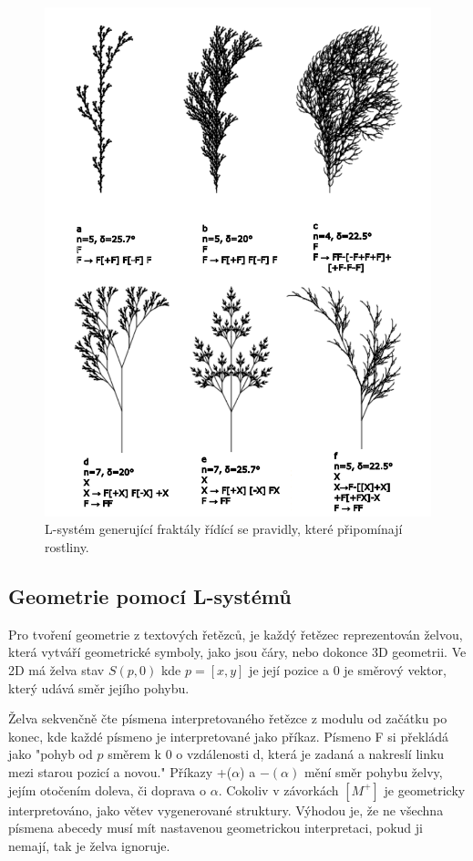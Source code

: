 \begin{figure}[H]
	\centering
	\includegraphics[scale=1]{obrazky-figures/LTrees.pdf}
	\caption{L-systém generující fraktály řídící se pravidly, které připomínají rostliny.}
	\label{lSystem}
\end{figure}

\subsection{Geometrie pomocí L-systémů}
\label{lsystemGeometry}
Pro tvoření geometrie z textových řetězců, je každý řetězec reprezentován želvou, která vytváří geometrické symboly, jako jsou čáry, nebo dokonce 3D geometrii.
Ve 2D má želva stav $S(p,0)$ kde $p=[x,y]$ je její pozice a $0$ je směrový vektor, který udává směr jejího pohybu. 

Želva sekvenčně čte písmena interpretovaného řetězce z modulu od začátku po konec, kde každé písmeno je interpretované jako příkaz. Písmeno F si překládá jako "pohyb od $p$ směrem k $0$ o vzdálenosti d, která je zadaná a nakreslí linku mezi starou pozicí a novou." Příkazy +($\alpha$) a $-(\alpha)$ mění směr pohybu želvy, jejím otočením doleva, či doprava o $\alpha$. Cokoliv v závorkách $[M^+]$ je geometricky interpretováno, jako větev vygenerované struktury. Výhodou je, že ne všechna písmena abecedy musí mít nastavenou geometrickou interpretaci, pokud ji nemají, tak je želva ignoruje.
\cite{prusinkiewicz1986graphical}

